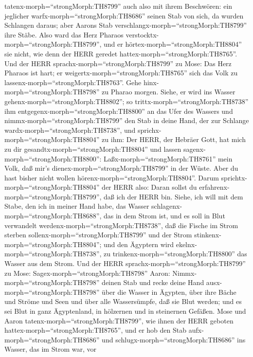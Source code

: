 tatenx-morph=``strongMorph:TH8799'' auch also mit ihrem Beschwören:
 ein jeglicher warfx-morph=``strongMorph:TH8686'' seinen
Stab von sich, da wurden Schlangen daraus; aber Aarons Stab
verschlangx-morph=``strongMorph:TH8799'' ihre Stäbe.  Also
ward das Herz Pharaos verstocktx-morph=``strongMorph:TH8799'', und er
hörtex-morph=``strongMorph:TH8804'' sie nicht, wie denn der HERR geredet
hattex-morph=``strongMorph:TH8765''.  Und der HERR
sprachx-morph=``strongMorph:TH8799'' zu Mose: Das Herz Pharaos ist hart;
er weigertx-morph=``strongMorph:TH8765'' sich das Volk zu
lassenx-morph=``strongMorph:TH8763''.  Gehe
hinx-morph=``strongMorph:TH8798'' zu Pharao morgen. Siehe, er wird ins
Wasser gehenx-morph=``strongMorph:TH8802''; so
trittx-morph=``strongMorph:TH8738'' ihm
entgegenx-morph=``strongMorph:TH8800'' an das Ufer des Wassers und
nimmx-morph=``strongMorph:TH8799'' den Stab in deine Hand, der zur
Schlange wardx-morph=``strongMorph:TH8738'',  und
sprichx-morph=``strongMorph:TH8804'' zu ihm: Der HERR, der Hebräer Gott,
hat mich zu dir gesandtx-morph=``strongMorph:TH8804'' und lassen
sagenx-morph=``strongMorph:TH8800'': Laßx-morph=``strongMorph:TH8761''
mein Volk, daß mir's dienex-morph=``strongMorph:TH8799'' in der Wüste.
Aber du hast bisher nicht wollen hörenx-morph=``strongMorph:TH8804''.
 Darum sprichtx-morph=``strongMorph:TH8804'' der HERR also:
Daran sollst du erfahrenx-morph=``strongMorph:TH8799'', daß ich der HERR
bin. Siehe, ich will mit dem Stabe, den ich in meiner Hand habe, das
Wasser schlagenx-morph=``strongMorph:TH8688'', das in dem Strom ist, und
es soll in Blut verwandelt werdenx-morph=``strongMorph:TH8738'',
 daß die Fische im Strom sterben
sollenx-morph=``strongMorph:TH8799'' und der Strom
stinkenx-morph=``strongMorph:TH8804''; und den Ägyptern wird
ekelnx-morph=``strongMorph:TH8738'', zu
trinkenx-morph=``strongMorph:TH8800'' das Wasser aus dem Strom.
 Und der HERR sprachx-morph=``strongMorph:TH8799'' zu Mose:
Sagex-morph=``strongMorph:TH8798'' Aaron:
Nimmx-morph=``strongMorph:TH8798'' deinen Stab und recke deine Hand
ausx-morph=``strongMorph:TH8798'' über die Wasser in Ägypten, über ihre
Bäche und Ströme und Seen und über alle Wassersümpfe, daß sie Blut
werden; und es sei Blut in ganz Ägyptenland, in hölzernen und in
steinernen Gefäßen.  Mose und Aaron
tatenx-morph=``strongMorph:TH8799'', wie ihnen der HERR geboten
hattex-morph=``strongMorph:TH8765'', und er hob den Stab
aufx-morph=``strongMorph:TH8686'' und
schlugx-morph=``strongMorph:TH8686'' ins Wasser, das im Strom war, vor

